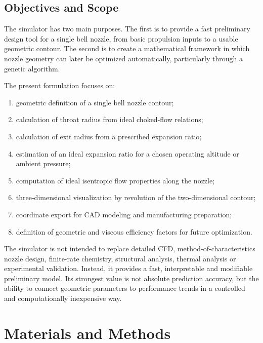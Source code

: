 \documentclass[journal,article,submit,oneauthor]{Definitions/mdpi}
\begin{document}
\subsection{Objectives and Scope}

The simulator has two main purposes. The first is to provide a fast preliminary design tool for a single bell nozzle, from basic propulsion inputs to a usable geometric contour. The second is to create a mathematical framework in which nozzle geometry can later be optimized automatically, particularly through a genetic algorithm.

The present formulation focuses on:
\begin{enumerate}
    \item geometric definition of a single bell nozzle contour;
    \item calculation of throat radius from ideal choked-flow relations;
    \item calculation of exit radius from a prescribed expansion ratio;
    \item estimation of an ideal expansion ratio for a chosen operating altitude or ambient pressure;
    \item computation of ideal isentropic flow properties along the nozzle;
    \item three-dimensional visualization by revolution of the two-dimensional contour;
    \item coordinate export for CAD modeling and manufacturing preparation;
    \item definition of geometric and viscous efficiency factors for future optimization.
\end{enumerate}

The simulator is not intended to replace detailed CFD, method-of-characteristics nozzle design, finite-rate chemistry, structural analysis, thermal analysis or experimental validation. Instead, it provides a fast, interpretable and modifiable preliminary model. Its strongest value is not absolute prediction accuracy, but the ability to connect geometric parameters to performance trends in a controlled and computationally inexpensive way.

\section{Materials and Methods}
\end{document}
